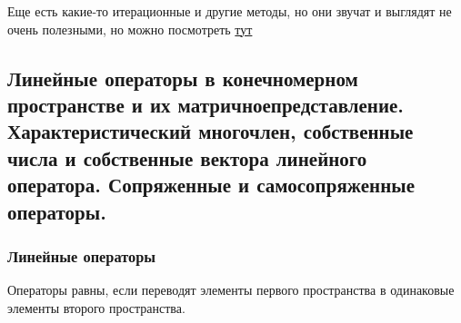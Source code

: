 \documentclass{article}
\begin{document}
Еще есть какие-то итерационные и другие методы, но они звучат и выглядят не очень полезными, но можно посмотреть \href{https://ru.wikipedia.org/wiki/%D0%A1%D0%B8%D1%81%D1%82%D0%B5%D0%BC%D0%B0_%D0%BB%D0%B8%D0%BD%D0%B5%D0%B9%D0%BD%D1%8B%D1%85_%D0%B0%D0%BB%D0%B3%D0%B5%D0%B1%D1%80%D0%B0%D0%B8%D1%87%D0%B5%D1%81%D0%BA%D0%B8%D1%85_%D1%83%D1%80%D0%B0%D0%B2%D0%BD%D0%B5%D0%BD%D0%B8%D0%B9#:~:text=%D0%A1%D0%B8%D1%81%D1%82%D0%B5%D0%BC%D0%B0%20%D0%BB%D0%B8%D0%BD%D0%B5%D0%B9%D0%BD%D1%8B%D1%85%20%D0%B0%D0%BB%D0%B3%D0%B5%D0%B1%D1%80%D0%B0%D0%B8%D1%87%D0%B5%D1%81%D0%BA%D0%B8%D1%85%20%D1%83%D1%80%D0%B0%D0%B2%D0%BD%D0%B5%D0%BD%D0%B8%D0%B9%20(%D0%BB%D0%B8%D0%BD%D0%B5%D0%B9%D0%BD%D0%B0%D1%8F,%D0%BB%D0%B8%D0%BD%D0%B5%D0%B9%D0%BD%D1%8B%D0%BC%20%E2%80%94%20%D0%B0%D0%BB%D0%B3%D0%B5%D0%B1%D1%80%D0%B0%D0%B8%D1%87%D0%B5%D1%81%D0%BA%D0%B8%D0%BC%20%D1%83%D1%80%D0%B0%D0%B2%D0%BD%D0%B5%D0%BD%D0%B8%D0%B5%D0%BC%20%D0%BF%D0%B5%D1%80%D0%B2%D0%BE%D0%B9%20%D1%81%D1%82%D0%B5%D0%BF%D0%B5%D0%BD%D0%B8}{тут}

\subsection{Линейные операторы в конечномерном пространстве и их матричноепредставление. Характеристический многочлен, собственные числа и собственные вектора линейного оператора. Сопряженные и самосопряженные операторы.}

\subsubsection{ Линейные операторы}


Операторы равны, если переводят элементы первого пространства в одинаковые элементы второго пространства.
\end{document}
